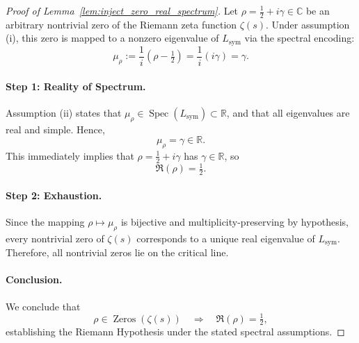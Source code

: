\begin{proof}[Proof of Lemma~\ref{lem:inject_zero_real_spectrum}]
Let \( \rho = \tfrac{1}{2} + i\gamma \in \mathbb{C} \) be an arbitrary nontrivial zero of the Riemann zeta function \( \zeta(s) \). Under assumption (i), this zero is mapped to a nonzero eigenvalue of \( L_{\mathrm{sym}} \) via the spectral encoding:
\[
\mu_\rho := \frac{1}{i}(\rho - \tfrac{1}{2}) = \frac{1}{i}(i\gamma) = \gamma.
\]

\paragraph{Step 1: Reality of Spectrum.}
Assumption (ii) states that \( \mu_\rho \in \operatorname{Spec}(L_{\mathrm{sym}}) \subset \mathbb{R} \), and that all eigenvalues are real and simple. Hence,
\[
\mu_\rho = \gamma \in \mathbb{R}.
\]
This immediately implies that \( \rho = \tfrac{1}{2} + i\gamma \) has \( \gamma \in \mathbb{R} \), so
\[
\Re(\rho) = \tfrac{1}{2}.
\]

\paragraph{Step 2: Exhaustion.}
Since the mapping \( \rho \mapsto \mu_\rho \) is bijective and multiplicity-preserving by hypothesis, every nontrivial zero of \( \zeta(s) \) corresponds to a unique real eigenvalue of \( L_{\mathrm{sym}} \). Therefore, all nontrivial zeros lie on the critical line.

\paragraph{Conclusion.}
We conclude that
\[
\rho \in \operatorname{Zeros}(\zeta(s)) \quad \Longrightarrow \quad \Re(\rho) = \tfrac{1}{2},
\]
establishing the Riemann Hypothesis under the stated spectral assumptions.
\end{proof}
